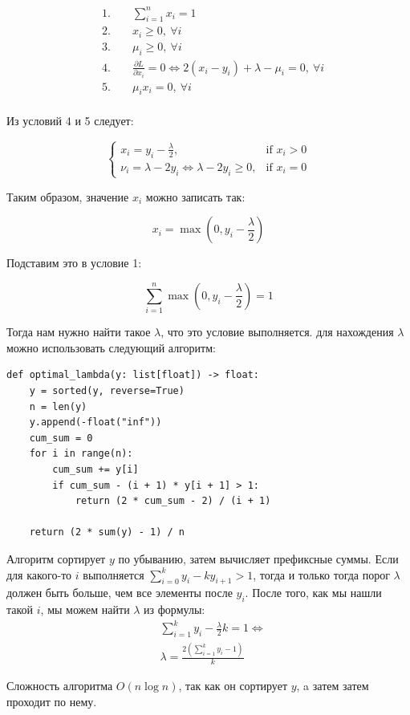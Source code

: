 \documentclass{article}
\begin{document}
\begin{enumerate}
	      \begin{equation*}
		      \begin{aligned}
			       & \text{1. } &  & \sum_{i=1}^n x_i = 1      \\
			       & \text{2. } &  & x_i \geq 0, \ \forall i   \\
			       & \text{3. } &  & \mu_i \geq 0, \ \forall i \\
			       & \text{4. } &  &
			      \frac{\partial L}{\partial x_i} = 0 \Longleftrightarrow 2(x_i - y_i) + \lambda - \mu_i = 0, \ \forall
			      i                                            \\ & \text{5. } & & \mu_i x_i = 0, \ \forall i \\
		      \end{aligned}
	      \end{equation*}

	      Из условий 4 и 5 следует:

	      \[
		      \begin{cases}
			      x_i = y_i - \frac{\lambda}{2},                     & \text{if } x_i > 0 \\
			      \nu_i = \lambda - 2y_i \iff \lambda - 2y_i \geq 0, & \text{if } x_i = 0
		      \end{cases}
	      \]

	      Таким образом, значение $x_i$ можно записать так:

	      \[
		      x_i = \max(0, y_i - \frac{\lambda}{2})
	      \]

	      Подставим это в условие 1:

	      \[
		      \sum_{i=1}^n \max(0, y_i - \frac{\lambda}{2}) = 1
	      \]

	      Тогда нам нужно найти такое $\lambda$, что это условие выполняется.
	      для нахождения $\lambda$ можно использовать следующий алгоритм:
	      \begin{lstlisting}
def optimal_lambda(y: list[float]) -> float:
    y = sorted(y, reverse=True)
    n = len(y)
    y.append(-float("inf"))
    cum_sum = 0
    for i in range(n):
        cum_sum += y[i]
        if cum_sum - (i + 1) * y[i + 1] > 1:
            return (2 * cum_sum - 2) / (i + 1)
    
    return (2 * sum(y) - 1) / n
          \end{lstlisting}

	      Алгоритм сортирует $y$ по убыванию, затем вычисляет префиксные суммы.
	      Если для какого-то $i$ выполняется $\sum_{i=0}^{k} y_i - ky_{i+1} > 1$,
	      тогда и только тогда порог $\lambda$ должен быть больше, чем все элементы
	      после $y_i$. После того, как мы нашли такой $i$, мы можем найти $\lambda$
	      из формулы:
	      \begin{align*}
		       & \sum_{i=1}^k y_i - \frac{\lambda}{2} k = 1 \iff           \\
		       & \lambda = \frac{2 \left( \sum_{i=1}^k y_i - 1 \right)}{k}
	      \end{align*}

	      Сложность алгоритма $O(n \log n)$, так как он сортирует $y$,
	      a затем затем проходит по нему.

\end{enumerate}
\end{document}
